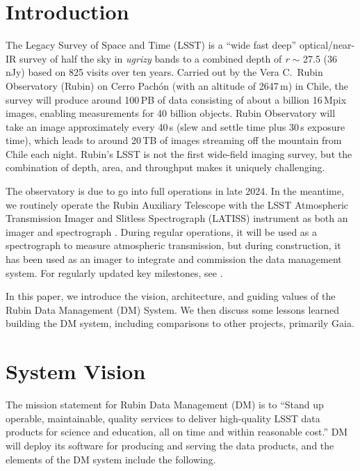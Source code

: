 \documentclass[11pt,twoside]{article}
\begin{document}
\section{Introduction}

The Legacy Survey of Space and Time (LSST) \citep{2019ApJ...873..111I} is a ``wide fast deep'' optical/near-IR survey of half the sky in \emph{ugrizy} bands to a combined depth of \emph{r} $\sim$ 27.5 (36\,nJy) based on 825 visits over ten years.
Carried out by the Vera C.\ Rubin Observatory (Rubin) on Cerro Pach\'{o}n (with an altitude of 2647\,m) in Chile, the survey will produce around 100\,PB of data consisting of about a billion 16\,Mpix images, enabling measurements for 40 billion objects.
Rubin Observatory will take an image approximately every 40\,s (slew and settle time plus 30\,s exposure time), which leads to around 20\,TB of images streaming off the mountain from Chile each night.
Rubin's LSST is not the first wide-field imaging survey, but the combination of depth, area, and throughput makes it uniquely challenging.

The observatory is due to go into full operations in late 2024.
In the meantime, we routinely operate the Rubin Auxiliary Telescope with the LSST Atmospheric Transmission Imager and Slitless Spectrograph (LATISS) instrument as both an imager and spectrograph \citep{2020SPIE11452E..0UI}.
During regular operations, it will be used as a spectrograph to measure atmospheric transmission, but during construction, it has been used as an imager to integrate and commission the data management system.
For regularly updated key milestones, see \citet{DMTN-232}.

In this paper, we introduce the vision, architecture, and guiding values of the Rubin Data Management (DM) System. We then discuss some lessons learned building the DM system, including comparisons to other projects, primarily Gaia.


\section{System Vision}

The mission statement for Rubin Data Management (DM) is to ``Stand up operable, maintainable, quality services to deliver high-quality LSST data products for science and education, all on time and within reasonable cost.'' DM will deploy its software for producing and serving the data products, and the elements of the DM system include the following.
\end{document}
